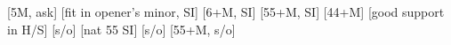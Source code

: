 \begin{bidsemi}
[5M, ask]
[fit in opener's minor, SI]
[6+M, SI]
[55+M, SI]
[44+M]
    [good support in H/S]
[s/o]
[nat 55 SI]
[s/o]
[55+M, s/o]
\end{bidsemi}